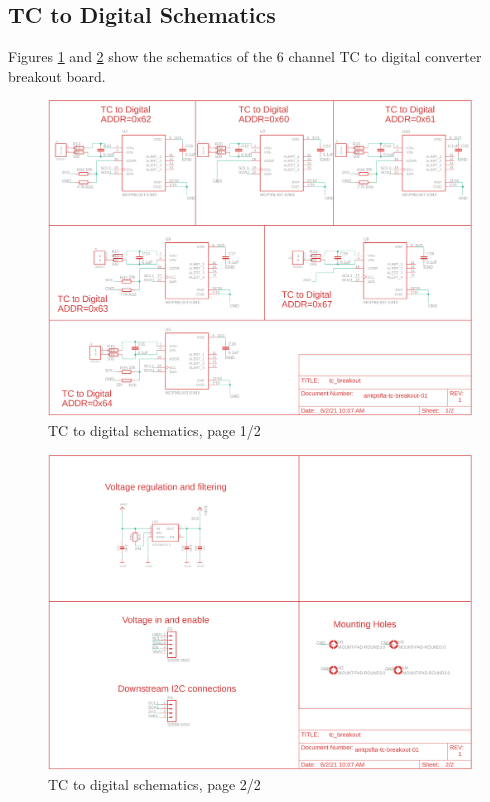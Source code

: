 \documentclass{article}
\begin{document}
\newpage
\subsection{TC to Digital Schematics}
Figures \ref{fig:schematic-tc-breakout-p1} and \ref{fig:schematic-tc-breakout-p2} show the schematics of the 6 channel TC to digital converter breakout board.
\begin{figure}[H]
	\centering
	\includegraphics[width=\textwidth]{images/tc-breakout-p1}
	\caption{TC to digital schematics, page 1/2}
	\label{fig:schematic-tc-breakout-p1}
\end{figure}

\begin{figure}[H]
	\centering
	\includegraphics[width=\textwidth]{images/tc-breakout-p2}
	\caption{TC to digital schematics, page 2/2}
	\label{fig:schematic-tc-breakout-p2}
\end{figure}
\end{document}
